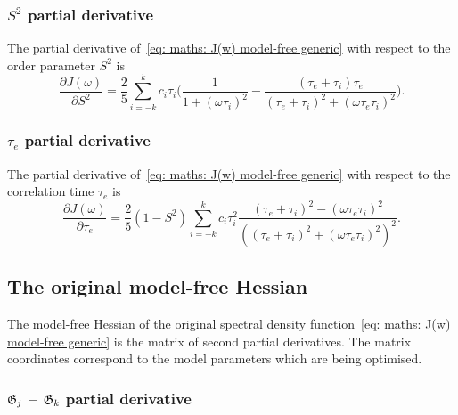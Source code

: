 \subsubsection{$S^2$ partial derivative}

The partial derivative of~\eqref{eq: maths: J(w) model-free generic} with respect to the order parameter $S^2$ is
\begin{equation}
    \frac{\partial J(\omega)}{\partial S^2} = \frac{2}{5} \sum_{i=-k}^k c_i \tau_i \Bigg(
        \frac{1}{1 + (\omega \tau_i)^2}
        - \frac{(\tau_e + \tau_i)\tau_e}{(\tau_e + \tau_i)^2 + (\omega \tau_e \tau_i)^2}
    \Bigg).
\end{equation}



\subsubsection{$\tau_e$ partial derivative}

The partial derivative of~\eqref{eq: maths: J(w) model-free generic} with respect to the correlation time $\tau_e$ is
\begin{equation}
    \frac{\partial J(\omega)}{\partial \tau_e} = \frac{2}{5} (1 - S^2) \sum_{i=-k}^k c_i \tau_i^2
        \frac{(\tau_e + \tau_i)^2 - (\omega \tau_e \tau_i)^2}{\left((\tau_e + \tau_i)^2 + (\omega \tau_e \tau_i)^2 \right)^2}.
\end{equation}




\newpage
\subsection{The original model-free Hessian}

The model-free Hessian of the original spectral density function~\eqref{eq: maths: J(w) model-free generic} is the matrix of second partial derivatives.  The matrix coordinates correspond to the model parameters which are being optimised.



\subsubsection{$\mathfrak{G}_j$ -- $\mathfrak{G}_k$ partial derivative}

